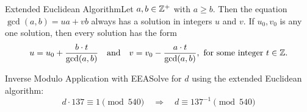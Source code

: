 \begin{theorem}
    {Extended Euclidean Algorithm}Let \(a,b \in \mathbb{Z}^+\) with \(a \geq b\). Then the equation \(\gcd(a,b) = ua + vb\) always has a solution in integers \(u\) and \(v\). If \(u_0,v_0\) is any one solution, then every solution has the form 
    \[
        u = u_0 + \frac{b \cdot t}{\gcd(a,b)} \quad \text{and} \quad v = v_0 - \frac{a \cdot t}{\gcd(a,b)}, \text{ for some integer } t \in \mathbb{Z}.
    \]
\end{theorem}

\begin{example}
    {Inverse Modulo Application with EEA}Solve for \(d\) using the extended Euclidean algorithm:
    \[
        d \cdot 137 \equiv 1 \pmod{540} \quad \Rightarrow \quad d \equiv 137^{-1} \pmod{540}
    \]
\end{example}

